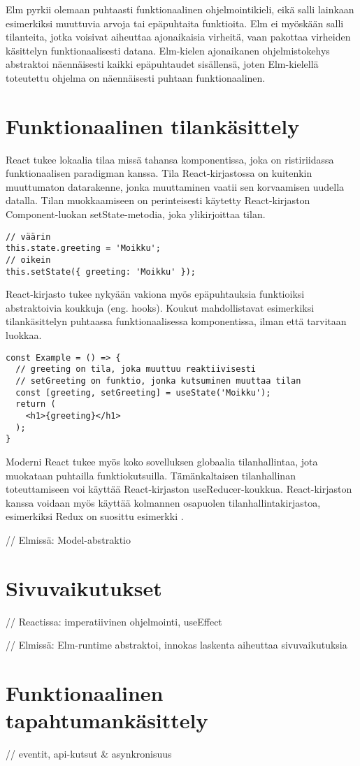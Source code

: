 Elm pyrkii olemaan puhtaasti funktionaalinen ohjelmointikieli, eikä salli lainkaan esimerkiksi muuttuvia arvoja tai
epäpuhtaita funktioita. Elm ei myöskään salli tilanteita, jotka voisivat aiheuttaa ajonaikaisia virheitä, vaan pakottaa
virheiden käsittelyn funktionaalisesti datana. Elm-kielen ajonaikanen ohjelmistokehys abstraktoi näennäisesti kaikki
epäpuhtaudet sisällensä, joten Elm-kielellä toteutettu ohjelma on näennäisesti puhtaan funktionaalinen. \cite{elmlang}

\section{Funktionaalinen tilankäsittely}
React tukee lokaalia tilaa missä tahansa komponentissa, joka on ristiriidassa funktionaalisen paradigman kanssa. Tila
React-kirjastossa on kuitenkin muuttumaton datarakenne, jonka muuttaminen vaatii sen korvaamisen uudella datalla. Tilan
muokkaamiseen on perinteisesti käytetty React-kirjaston Component-luokan setState-metodia, joka ylikirjoittaa tilan.
\begin{verbatim}
// väärin
this.state.greeting = 'Moikku';
// oikein
this.setState({ greeting: 'Moikku' });
\end{verbatim}
React-kirjasto tukee nykyään vakiona myös epäpuhtauksia funktioiksi abstraktoivia koukkuja (eng. hooks). Koukut
mahdollistavat esimerkiksi tilankäsittelyn puhtaassa funktionaalisessa komponentissa, ilman että tarvitaan luokkaa.
\begin{verbatim}
const Example = () => {
  // greeting on tila, joka muuttuu reaktiivisesti
  // setGreeting on funktio, jonka kutsuminen muuttaa tilan
  const [greeting, setGreeting] = useState('Moikku');
  return (
    <h1>{greeting}</h1>
  );
}
\end{verbatim}
Moderni React tukee myös koko sovelluksen globaalia tilanhallintaa, jota muokataan puhtailla funktiokutsuilla.
Tämänkaltaisen tilanhallinan toteuttamiseen voi käyttää React-kirjaston useReducer-koukkua. React-kirjaston kanssa
voidaan myös käyttää kolmannen osapuolen tilanhallintakirjastoa, esimerkiksi Redux on suosittu esimerkki
\cite{functionalwebdev}. \cite{reactjs}

// Elmissä: Model-abstraktio

\section{Sivuvaikutukset}

// Reactissa: imperatiivinen ohjelmointi, useEffect

// Elmissä: Elm-runtime abstraktoi, innokas laskenta aiheuttaa sivuvaikutuksia

\section{Funktionaalinen tapahtumankäsittely}

// eventit, api-kutsut \& asynkronisuus

